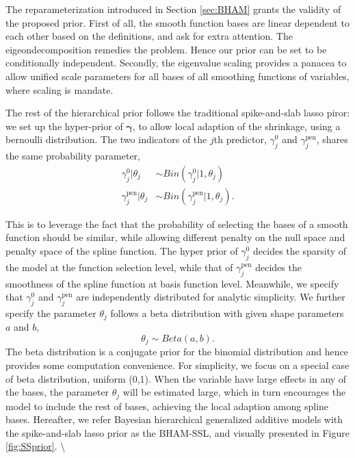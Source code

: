 \documentclass[AMA,STIX1COL,]{WileyNJD-v2}
\begin{document}
The reparameterization introduced in Section \ref{sec:BHAM} grants the
validity of the proposed prior. First of all, the smooth function bases
are linear dependent to each other based on the definitions, and ask for
extra attention. The eigeondecomposition remedies the problem. Hence our
prior can be set to be conditionally independent. Secondly, the
eigenvalue scaling provides a panacea to allow unified scale parameters
for all bases of all smoothing functions of variables, where scaling is
mandate.

The rest of the hierarchical prior follows the traditional
spike-and-slab lasso piror: we set up the hyper-prior of
\(\boldsymbol{\gamma}\), to allow local adaption of the shrinkage, using
a bernoulli distribution. The two indicators of the \(j\)th predictor,
\(\gamma^{0}_j\) and \(\gamma^\text{pen}_j\), shares the same
probability parameter, \[
\begin{aligned}
\gamma_{j}^{0} | \theta_j &\sim Bin(\gamma^{0}_{j}|1, \theta_j)\\
\gamma_{j}^\text{pen}| \theta_j &\sim Bin(\gamma^\text{pen}_{j}|1, \theta_j).
\end{aligned}
\]

This is to leverage the fact that the probability of selecting the bases
of a smooth function should be similar, while allowing different penalty
on the null space and penalty space of the spline function. The hyper
prior of \(\gamma_{j}^{0}\) decides the sparsity of the model at the
function selection level, while that of \(\gamma_{j}^\text{pen}\)
decides the smoothness of the spline function at basis function level.
Meanwhile, we specify that \(\gamma_{j}^0\) and
\(\gamma_{j}^\text{pen}\) are independently distributed for analytic
simplicity. We further specify the parameter \(\theta_j\) follows a beta
distribution with given shape parameters \(a\) and \(b\), \[
\theta_j \sim Beta(a, b).
\] The beta distribution is a conjugate prior for the binomial
distribution and hence provides some computation convenience. For
simplicity, we focus on a special case of beta distribution, uniform
(0,1). When the variable have large effects in any of the bases, the
parameter \(\theta_j\) will be estimated large, which in turn encourages
the model to include the rest of bases, achieving the local adaption
among spline bases. Hereafter, we refer Bayesian hierarchical
generalized additive models with the spike-and-slab lasso prior as the
BHAM-SSL, and visually presented in Figure \ref{fig:SSprior}.
\textbackslash{}
\end{document}
